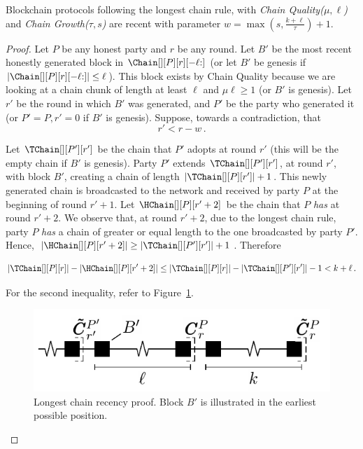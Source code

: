 \begin{lemma}\label{thm.longest-chain-recency}
  Blockchain protocols following the longest chain rule,
  with \emph{Chain Quality($\mu,\ell$)} and
  \emph{Chain Growth($\tau, s$)}
  are recent with parameter $w = \max(s, \frac{k + \ell}{\tau}) + 1$.
\end{lemma}
\begin{proof}
  Let $P$ be any honest party and $r$ be any round.
  Let $B'$ be the most recent honestly generated block
  in $\Chain[][P][r][{-\ell}{:}]$
  (or let $B'$ be genesis if $|\Chain[][P][r][{-\ell}{:}]| \leq \ell$).
  This block exists by
  Chain Quality because we are looking at a chain chunk of length at least $\ell$ and
  $\mu\ell \geq 1$ (or $B'$ is genesis).
  Let $r'$ be the round in which $B'$ was generated, and
  $P'$ be the party who generated it
  (or $P' = P, r' = 0$ if $B'$ is genesis).
  Suppose, towards a contradiction, that
  \begin{equation}
    r' < r - w\,.\label{eq:bitcoin-r-bound}
  \end{equation}

  Let $\TChain[][P'][r']$ be the chain that $P'$ adopts at
  round $r'$ (this will be the empty chain if $B'$ is genesis).
  Party $P'$ extends $\TChain[][P'][r']$, at round $r'$, with block $B'$,
  creating a chain of length $|\TChain[][P][r']| + 1$.
  This newly generated chain is broadcasted to the network and
  received by party $P$ at the beginning of round $r' + 1$.
  Let $\HChain[][P][r' + 2]$ be the chain
  that $P$ \emph{has} at round $r' + 2$.
  We observe that, at round $r' + 2$, due to the
  longest chain rule, party $P$ \emph{has} a chain of greater or equal
  length to the one broadcasted by party $P'$. Hence,
  $|\HChain[][P][r' + 2]| \geq |\TChain[][P'][r']| + 1$. Therefore

  \begin{equation}
    |\TChain[][P][r]| - |\HChain[][P][r' + 2]| \leq
     |\TChain[][P][r]| - |\TChain[][P'][r']| - 1 <
     k + \ell\,. \label{eq:bitcoin-contradiction}
  \end{equation}

  For the second inequality, refer to Figure~\ref{fig:longest-chain-recency-proof}.

  \begin{figure}
    \centering
    \includegraphics[width=0.5\columnwidth,keepaspectratio]{figures/longest-chain-proof.pdf}
    \caption{Longest chain recency proof. Block $B'$ is illustrated in the
             earliest possible position.
    }
   \label{fig:longest-chain-recency-proof}
  \end{figure}


\end{proof}
